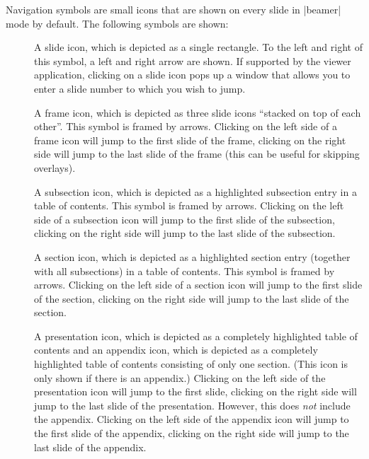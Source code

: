 Navigation symbols are small icons that are shown on every slide in |beamer| mode by default. The following symbols are shown:
\begin{warpprint}
\begin{description}
\item[{\makebox[0.7cm][l]{\insertslidenavigationsymbol}}]
  A slide icon, which is depicted as a single rectangle. To the left and right of this symbol, a left and right arrow are shown.\newline
  If supported by the viewer application, clicking on a slide icon pops up a window that allows you to enter a slide number to which you wish to jump.
\item[{\makebox[0.7cm][l]{\insertframenavigationsymbol}}]
  A frame icon, which is depicted as three slide icons ``stacked on top of each other''. This symbol is framed by arrows.\newline
  Clicking on the left side of a frame icon will jump to the first slide of the frame, clicking on the right side will jump to the last slide of the frame (this can be useful for skipping overlays).
\item[{\makebox[0.7cm][l]{\insertsubsectionnavigationsymbol}}]
  A subsection icon, which is depicted as a highlighted subsection entry in a table of contents. This symbol is framed by arrows.\newline
  Clicking on the left side of a subsection icon will jump to the first slide of the subsection, clicking on the right side will jump to the last slide of the subsection.
\item[{\makebox[0.7cm][l]{\insertsectionnavigationsymbol}}]
  A section icon, which is depicted as a highlighted section entry (together with all subsections) in a table of contents. This symbol is framed by arrows.\newline
  Clicking on the left side of a section icon will jump to the first slide of the section, clicking on the right side will jump to the last slide of the section.
\item[{\makebox[0.7cm][l]{\insertdocnavigationsymbol}}]
  A presentation icon, which is depicted as a completely highlighted table of contents and an appendix icon, which is depicted as a completely highlighted table of contents consisting of only one section. (This icon is only shown if there is an appendix.)\newline
  Clicking on the left side of the presentation icon will jump to the first slide, clicking on the right side will jump to the last slide of the presentation. However, this does \emph{not} include the appendix. Clicking on the left side of the appendix icon will jump to the first slide of the appendix, clicking on the right side will jump to the last slide of the appendix.

\end{description}
\end{warpprint}
